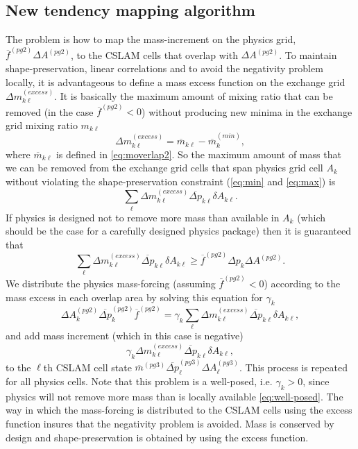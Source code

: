 \documentclass{agujournal}
\begin{document}
\subsection{New tendency mapping algorithm}\label{sec:massfix}
The problem is how to map the mass-increment on the physics grid, ${\overline{f}}^{(pg2)}\Delta A^{(pg2)}$, to the CSLAM cells that overlap with $\Delta A^{(pg2)}$. To maintain shape-preservation, linear correlations and to avoid the negativity problem locally, it is advantageous to define a mass excess function on the exchange grid $\Delta m_{k\ell}^{(excess)}$. It is basically the maximum amount of mixing ratio that can be removed (in the case ${\overline{f}}^{(pg2)}<0$) without producing new minima in the exchange grid mixing ratio $m_{k\ell}$
\begin{equation}
\Delta m^{(excess)}_{k\ell}=\overline{m}_{k\ell}-\overline{m}_k^{(min)},
\end{equation}
where $\overline{m}_{k\ell}$ is defined in \eqref{eq:moverlap2}. So the maximum amount of mass that we can be removed from the exchange grid cells that span physics grid cell $A_k$ without violating the shape-preservation constraint (\eqref{eq:min} and \eqref{eq:max}) is
\begin{equation}
\sum_\ell \Delta m^{(excess)}_{k\ell}\overline{\Delta p}_{k\ell} \delta A_{k\ell}.
\end{equation}
If physics is designed not to remove more mass than available in $A_k$ (which should be the case for a carefully designed physics package) then it is guaranteed that
\begin{equation}
\label{eq:well-posed}
\sum_\ell \Delta m^{(excess)}_{k\ell}\overline{\Delta p}_{k\ell} \delta A_{k\ell}\ge {\overline{f}}^{(pg2)}\Delta p_k\Delta A^{(pg2)}.
\end{equation}
We distribute the physics mass-forcing (assuming ${\overline{f}}^{(pg2)}<0$) according to the mass excess in each overlap area by solving this equation for $\gamma_k$
\begin{equation}
\label{eq:mass-excess}
\Delta A_k^{(pg2)}\overline{\Delta p}_k^{(pg2)}{\overline{f}}^{(pg2)}=\gamma_k \sum_\ell \Delta m^{(excess)}_{k\ell}\overline{\Delta p}_{k\ell} \delta A_{k\ell},
\end{equation}
and add mass increment (which in this case is negative)
\begin{equation}
\label{eq:mass-incr}
\gamma_k \Delta m^{(excess)}_{k\ell}\overline{\Delta p}_{k\ell} \delta A_{k\ell},
\end{equation}
to the $\ell$th CSLAM cell state ${\overline{m}}^{(pg3)} \overline{\Delta p}^{(pg3)}_\ell \Delta A^{(pg3)}_\ell$. This process is repeated for all physics cells. Note that this problem is a well-posed, i.e. $\gamma_k>0$, since physics will not remove more mass than is locally available \eqref{eq:well-posed}. The way in which the mass-forcing is distributed to the CSLAM cells using the excess function insures that the negativity problem is avoided. Mass is conserved by design and shape-preservation is obtained by using the excess function.
\end{document}
